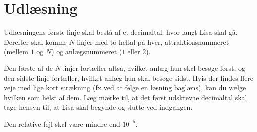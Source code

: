 \section*{Udlæsning}
Udlæsningens første linje skal bestå af et decimaltal: hvor langt Lisa skal gå. 
Derefter skal komme $N$ linjer med to heltal på hver, attraktionsnummeret (mellem $1$ og $N$) og anlægsnummeret ($1$ eller $2$).

Den første af de $N$ linjer fortæller altså, hvilket anlæg hun skal besøge først, og den sidste linje fortæller, hvilket anlæg hun skal besøge sidst.
Hvis der findes flere veje med lige kort strækning (fx ved at følge en løsning baglæns), kan du vælge hvilken som helst af dem.
Læg mærke til, at det først udskrevne decimaltal skal tage hensyn til, at Lisa skal begynde og slutte ved indgangen.

Den relative fejl skal være mindre end $10^{-5}$.
